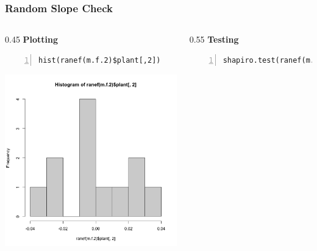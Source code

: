 \documentclass{beamer}
\begin{document}
\begin{frame}[fragile]
    \frametitle{Random Slope Check}
    \begin{columns}
        \begin{column}{0.45\textwidth}
            \textbf{Plotting}
            \scriptsize
            \begin{Verbatim}[numbers=left,numbersep=6pt,frame=single]
hist(ranef(m.f.2)$plant[,2])
            \end{Verbatim}
            \includegraphics[width=\textwidth]{lectures/day_7_diagnostics_of_mems/figures/unnamed-chunk-16-1.png}
        \end{column}
        \begin{column}{0.55\textwidth}
            \textbf{Testing}
            \scriptsize
            \begin{Verbatim}[numbers=left,numbersep=6pt,frame=single]
shapiro.test(ranef(m.f.2)$plant[,2])
            \end{Verbatim}
            \scalebox{1}{
                
            }
            \vspace{3.25cm}
            
        \end{column}
    \end{columns}
\end{frame}
\end{document}
